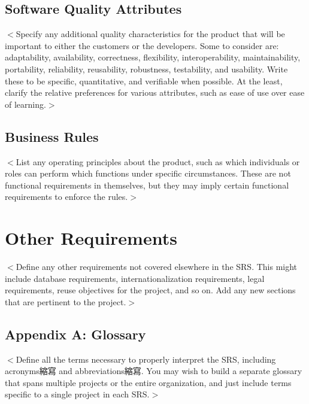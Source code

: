 \documentclass{scrreprt}
\begin{document}
\section{Software Quality Attributes}
\begin{CJK}{UTF8}{<font>}
$<$Specify any additional quality characteristics for the product that will be 
important to either the customers or the developers. Some to consider are: 
adaptability, availability, correctness, flexibility, interoperability, 
maintainability, portability, reliability, reusability, robustness, testability, 
and usability. Write these to be specific, quantitative, and verifiable when 
possible. At the least, clarify the relative preferences for various attributes, 
such as ease of use over ease of learning.$>$
\end{CJK}

\section{Business Rules}
\begin{CJK}{UTF8}{<font>}

$<$List any operating principles about the product, such as which individuals or roles can perform which functions under specific circumstances. These are not  functional requirements in themselves, but they may imply certain functional  requirements to enforce the rules.$>$
\end{CJK}


\chapter{Other Requirements}
\begin{CJK}{UTF8}{<font>}
$<$Define any other requirements not covered elsewhere in the SRS. This might 
include database requirements, internationalization requirements, legal 
requirements, reuse objectives for the project, and so on. Add any new sections 
that are pertinent to the project.$>$
\end{CJK}

\section{Appendix A: Glossary}
\begin{CJK}{UTF8}{<font>}
$<$Define all the terms necessary to properly interpret the SRS, including 
acronyms縮寫 and abbreviations縮寫. You may wish to build a separate glossary that spans 
multiple projects or the entire organization, and just include terms specific to 
a single project in each SRS.$>$
\end{CJK}
\end{document}
